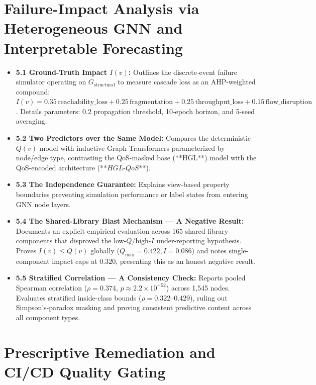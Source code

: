 \documentclass[review]{elsarticle}
\begin{document}
\section{Failure-Impact Analysis via Heterogeneous GNN and Interpretable Forecasting}

\begin{itemize}[leftmargin=*]
  \item \textbf{5.1 Ground-Truth Impact $I(v)$:} Outlines the discrete-event failure simulator operating on $G_{\text{structural}}$ to measure cascade loss as an AHP-weighted compound: $I(v) = 0.35\,\text{reachability\_loss} + 0.25\,\text{fragmentation} + 0.25\,\text{throughput\_loss} + 0.15\,\text{flow\_disruption}$. Details parameters: $0.2$ propagation threshold, 10-epoch horizon, and 5-seed averaging.
  \item \textbf{5.2 Two Predictors over the Same Model:} Compares the deterministic $Q(v)$ model with inductive Graph Transformers parameterized by node/edge type, contrasting the QoS-masked base (**HGL**) model with the QoS-encoded architecture (**$HGL\text{-}QoS$**).
  \item \textbf{5.3 The Independence Guarantee:} Explains view-based property boundaries preventing simulation performance or label states from entering GNN node layers.
  \item \textbf{5.4 The Shared-Library Blast Mechanism --- A Negative Result:} Documents an explicit empirical evaluation across 165 shared library components that disproved the low-$Q$/high-$I$ under-reporting hypothesis. Proves $I(v) \le Q(v)$ globally ($Q_{\max} = 0.422, I = 0.086$) and notes single-component impact caps at $0.320$, presenting this as an honest negative result.
  \item \textbf{5.5 Stratified Correlation --- A Consistency Check:} Reports pooled Spearman correlation ($\rho = 0.374$, $p \approx 2.2\times10^{-52}$) across 1,545 nodes. Evaluates stratified inside-class bounds ($\rho = 0.322$--$0.429$), ruling out Simpson's-paradox masking and proving consistent predictive content across all component types.
\end{itemize}

\section{Prescriptive Remediation and CI/CD Quality Gating}
\end{document}
